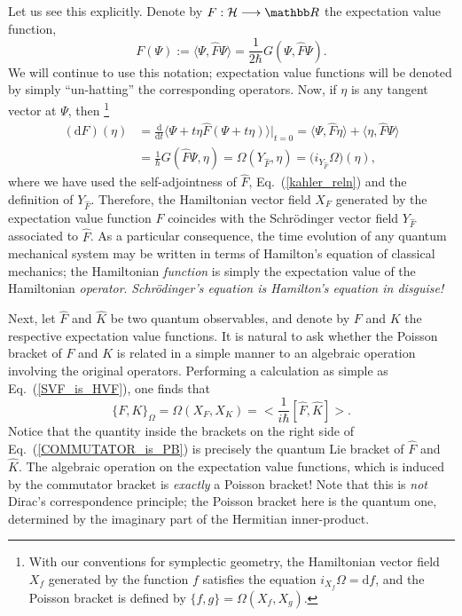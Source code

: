 \documentclass[12pt,aps,eqsecnum,tighten,nofootinbib]{revtex4-2}
\def\be{\begin{equation}}
\def\ee{\end{equation}}
\def\ba{\begin{eqnarray}}
\def\ea{\end{eqnarray}}
\def\<{\langle}
\def\>{\rangle}
\def\d{{\mathrm d}}
\def\i{{i}}
\def\H{{\cal H}}
\def\W{\Omega}
\newcommand{\eqn}[1]{Eq.~(\ref{#1})}
\newcommand{\hvf}[1]{{X_{#1}}}
\def\R{\mathbb R}
\begin{document}
Let us see this explicitly.  Denote by $F : \H \longrightarrow \R$ the
expectation value function,
%
\be
	F(\Psi) := \< \Psi, \hat{F}\Psi \> 
		 = \frac{1}{2\hbar}G(\Psi, \hat{F}\Psi).
\ee
%
We will continue to use this notation; expectation value functions
will be denoted by simply ``un-hatting'' the corresponding operators.
Now, if $\eta$ is any tangent vector at $\Psi$, then%
%
\footnote{With our conventions for symplectic geometry, the
Hamiltonian vector field $\hvf{f}$ generated by the function $f$
satisfies the equation $i_\hvf{f}\W = \d f$, and the Poisson bracket
is defined by $\{f, g \} = \W(\hvf{f}, \hvf{g})$.}
%
\ba
\label{SVF_is_HVF}
(\d F)(\eta) &= \frac{\d}{\d t} \< \Psi + t\eta \hat{F}
(\Psi + t \eta) \> \big|_{t=0}
= \< \Psi, \hat{F}\eta \> + \< \eta, \hat{F}\Psi \>\nonumber \\
&= \frac{1}{\hbar} G(\hat{F}\Psi, \eta)
= \W(Y_{\hat{F}}, \eta) = \big(i_{Y_{\hat{F}}} \W\big)(\eta),
\ea
%
where we have used the self-adjointness of $\hat{F}$,
\eqn{kahler_reln} and the definition of $Y_{\hat{F}}$.  Therefore, the
Hamiltonian vector field $\hvf{F}$ generated by the expectation value
function $F$ coincides with the Schr\"odinger vector field
$Y_{\hat{F}}$ associated to $\hat{F}$.  As a particular consequence,
the time evolution of any quantum mechanical system may be written in
terms of Hamilton's equation of classical mechanics; the Hamiltonian
{\em function} is simply the expectation value of the Hamiltonian {\em
operator}.  {\em Schr\"odinger's equation is Hamilton's equation in
disguise!}

Next, let $\hat{F}$ and $\hat{K}$ be two quantum observables, and
denote by $F$ and $K$ the respective expectation value functions.  It
is natural to ask whether the Poisson bracket of $F$ and $K$ is
related in a simple manner to an algebraic operation involving the
original operators. Performing a calculation as simple as
\eqn{SVF_is_HVF}, one finds that
%
\be \label{COMMUTATOR_is_PB}
\{ F, K \}_\W = \W(\hvf{F}, \hvf{K})
= \bigg< \frac{1}{\i\hbar} [\hat{F}, \hat{K}] \bigg>.
\ee
%
Notice that the quantity inside the brackets on the right side of
\eqn{COMMUTATOR_is_PB} is precisely the quantum Lie bracket of
$\hat{F}$ and $\hat{K}$.  The algebraic operation on the expectation
value functions, which is induced by the commutator bracket is {\em
exactly} a Poisson bracket!  Note that this is {\em not} Dirac's
correspondence principle; the Poisson bracket here is the quantum one,
determined by the imaginary part of the Hermitian inner-product.
\end{document}
